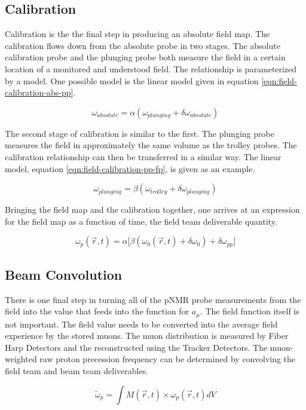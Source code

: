 \subsection{Calibration}

Calibration is the the final step in producing an absolute field map.  The calibration flows down from the absolute probe in two stages.  The absolute calibration probe and the plunging probe both measure the field in a certain location of a monitored and understood field.  The relationship is parameterized by a model.  One possible model is the linear model given in equation \ref{eqn:field-calibration-abs-pp}.

\begin{equation}
\label{eqn:field-calibration-abs-pp}
\omega_{absolute} = \alpha(\omega_{plunging} + \delta \omega_{absolute})
\end{equation}

The second stage of calibration is similar to the first.  The plunging probe measures the field in approximately the same volume as the trolley probes.  The calibration relationship can then be transferred in a similar way.  The linear model, equation \ref{eqn:field-calibration-pp-fp}, is given as an example.

\begin{equation}
\label{eqn:field-calibration-pp-fp}
\omega_{plunging} = \beta(\omega_{trolley} + \delta \omega_{plunging})
\end{equation}

Bringing the field map and the calibration together, one arrives at an expression for the field map as a function of time, the field team deliverable quantity.

\begin{equation}
\label{eqn:field-omega-p}
\omega_p(\vec{r}, t) = \alpha 
\Big [ 
\beta (\omega_0(\vec{r}, t) + \delta \omega_0) + \delta \omega_{pp}
\Big ]
\end{equation}

\subsection{Beam Convolution}

There is one final step in turning all of the pNMR probe measurements from the field into the value that feeds into the function for $a_\mu$.  The field function itself is not important.  The field value needs to be converted into the average field experience by the stored muons.  The muon distribution is measured by Fiber Harp Detectors and the reconstructed using the Tracker Detectors\cite{e989-tdr}.  The muon-weighted raw proton precession frequency can be determined by convolving the field team and beam team deliverables.

\begin{equation}
\label{eqn:field-omega-p-tilde}
\tilde{\omega}_p = \int M(\vec{r}, t) \times \omega_p(\vec{r}, t) dV
\end{equation}
